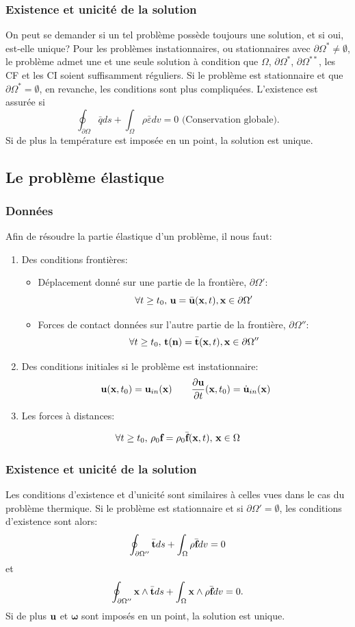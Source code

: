 \subsubsection*{Existence et unicité de la solution}
On peut se demander si un tel problème possède toujours une solution, et si oui, est-elle unique? Pour les problèmes instationnaires, ou stationnaires avec $\partial\Omega^*\neq \emptyset$, le problème admet une et une seule solution à condition que $\Omega$, $\partial\Omega^*$, $\partial\Omega^{**}$, les CF et les CI soient suffisamment réguliers. Si le problème est stationnaire et que $\partial\Omega^*=\emptyset$, en revanche, les conditions sont plus compliquées. L'existence est assurée si
$$\oint_{\partial\Omega}\bar{q}ds+\int_{\Omega}\rho\bar{\varepsilon}dv=0\text{  (Conservation globale)}.$$
Si de plus la température est imposée en un point, la solution est unique.

\subsection{Le problème élastique}
\subsubsection*{Données}
Afin de résoudre la partie élastique d'un problème, il nous faut:
\begin{enumerate}
\item Des conditions frontières:
	\begin{itemize}
	\item Déplacement donné sur une partie de la frontière, $\partial\Omega'$:
	 $$\forall t\geq t_0,\, \textbf{u}=\bar{\textbf{u}}(\textbf{x},t), \textbf{x}\in\partial\Omega'$$
	\item Forces de contact données sur l'autre partie de la frontière, $\partial\Omega''$:
	 $$\forall t\geq t_0,\, \textbf{t}(\textbf{n})=\bar{\textbf{t}}(\textbf{x},t), \textbf{x}\in\partial\Omega''$$
	\end{itemize}
\item Des conditions initiales si le problème est instationnaire: $$\textbf{u}(\textbf{x},t_0)=\textbf{u}_{in}(\textbf{x})\qquad \frac{\partial\textbf{u}}{\partial t}(\textbf{x},t_0)=\dot{\textbf{u}}_{in}(\textbf{x})$$
\item Les forces à distances:
\end{enumerate}
$$\forall t \geq t_0,\, \rho_0\textbf{f}=\rho_0\bar{\textbf{f}}(\textbf{x},t),\,\textbf{x}\in\Omega$$
\subsubsection*{Existence et unicité de la solution}
Les conditions d'existence et d'unicité sont similaires à celles vues dans le cas du problème thermique. Si le problème est stationnaire et si $\partial\Omega'=\emptyset$, les conditions d'existence sont alors:
$$\oint_{\partial\Omega''}\bar{\textbf{t}}ds+\int_{\Omega}\rho\bar{\textbf{f}}dv=0$$
et
$$\oint_{\partial\Omega''}\textbf{x}\wedge\bar{\textbf{t}}ds+\int_{\Omega}\textbf{x}\wedge\rho\bar{\textbf{f}}dv=0.$$Si de plus $\textbf{u}$ et $\boldsymbol{\omega}$ sont imposés en un point, la solution est unique.
